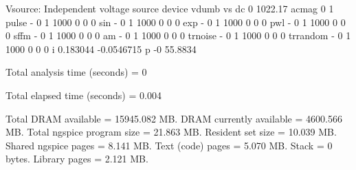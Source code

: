  Vsource: Independent voltage source
     device                 vdumb                    vs
         dc                     0               1022.17
      acmag                     0                     1
      pulse         -                     0
                                          1
                                       1000
                                          0
                                          0
                                          0
        sin         -                     0
                                          1
                                       1000
                                          0
                                          0
                                          0
        exp         -                     0
                                          1
                                       1000
                                          0
                                          0
                                          0
        pwl         -                     0
                                          1
                                       1000
                                          0
                                          0
                                          0
       sffm         -                     0
                                          1
                                       1000
                                          0
                                          0
                                          0
         am         -                     0
                                          1
                                       1000
                                          0
                                          0
                                          0
    trnoise         -                     0
                                          1
                                       1000
                                          0
                                          0
                                          0
   trrandom         -                     0
                                          1
                                       1000
                                          0
                                          0
                                          0
          i              0.183044            -0.0546715
          p                    -0               55.8834


Total analysis time (seconds) = 0

Total elapsed time (seconds) = 0.004 

Total DRAM available = 15945.082 MB.
DRAM currently available = 4600.566 MB.
Total ngspice program size =   21.863 MB.
Resident set size =   10.039 MB.
Shared ngspice pages =    8.141 MB.
Text (code) pages =    5.070 MB.
Stack = 0 bytes.
Library pages =    2.121 MB.

